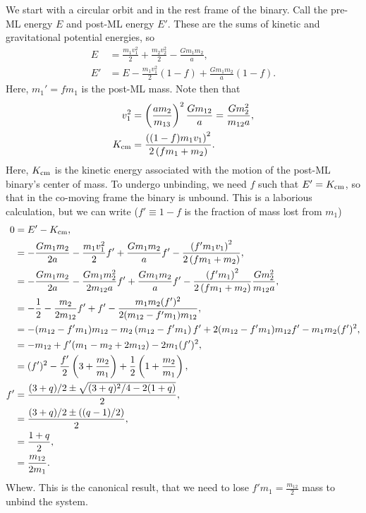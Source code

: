 \documentclass[12pt]{article}
\newcommand*{\p}[1]{\left(#1\right)}
\begin{document}
We start with a circular orbit and in the rest frame of the binary. Call the
pre-ML energy $E$ and post-ML energy $E'$. These are the sums of kinetic and
gravitational potential energies, so
\begin{align}
    E &= \frac{m_1v_1^2}{2} + \frac{m_2v_2^2}{2} - \frac{Gm_1m_2}{a},\\
    E' &= E - \frac{m_1v_1^2}{2}(1 - f) + \frac{Gm_1m_2}{a}\p{1 - f}.
\end{align}
Here, $m_1' = fm_1$ is the post-ML mass. Note then that
\begin{align}
    v_1^2 &= \p{\frac{am_2}{m_{13}}}^2\frac{Gm_{12}}{a}
        = \frac{Gm_2^2}{m_{12}a},\\
    K_{\rm cm} &= \frac{\p{(1 - f)m_1v_1}^2}{2\p{fm_1 + m_2}}.
\end{align}
Here, $K_{\rm cm}$ is the kinetic energy associated with the motion of the
post-ML binary's center of mass. To undergo unbinding, we need $f$ such that $E'
= K_{\rm cm}$, so that in the co-moving frame the binary is unbound. This is a
laborious calculation, but we can write ($f' \equiv 1 - f$ is the fraction of
mass lost from $m_1$)
\begin{align*}
    0 &= E' - K_{\rm cm},\\
        &= -\frac{Gm_1m_2}{2a}
            - \frac{m_1v_1^2}{2}f' + \frac{Gm_1m_2}{a}f'
            - \frac{\p{f'm_1v_1}^2}{2\p{fm_1 + m_2}},\\
        &= -\frac{Gm_1m_2}{2a}
            - \frac{Gm_1m_2^2}{2m_{12}a}f' + \frac{Gm_1m_2}{a}f'
            - \frac{\p{f'm_1}^2}{2\p{fm_1 + m_2}}
                \frac{Gm_2^2}{m_{12}a},\\
        &= -\frac{1}{2} - \frac{m_2}{2m_{12}}f'
            + f'
            - \frac{m_1m_2(f')^2}{2(m_{12} - f'm_1)m_{12}},\\
        &= -(m_{12} - f'm_1)m_{12}
            - m_2\p{m_{12} - f'm_1}f'
            + 2(m_{12} - f'm_1)m_{12}f'
            - m_1m_2(f')^2,\\
        &= -m_{12} + f'(m_1 - m_2 + 2m_{12})
            - 2m_1(f')^2,\\
        &= (f')^2 - \frac{f'}{2}\p{3 + \frac{m_2}{m_1}}
            + \frac{1}{2}\p{1 + \frac{m_2}{m_1}},\\
    f' &= \frac{(3 + q)/2 \pm \sqrt{(3 + q)^2/4 - 2(1+q)}}{2},\\
        &= \frac{(3 + q)/2 \pm ((q-1)/2)}{2},\\
        &= \frac{1 + q}{2},\\
        &= \frac{m_{12}}{2m_1}.
\end{align*}
Whew. This is the canonical result, that we need to lose $f'm_1 =
\frac{m_{12}}{2}$ mass to unbind the system.
\end{document}
